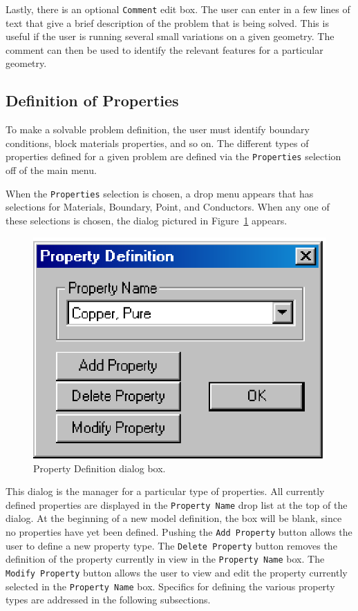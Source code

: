 Lastly, there is an optional \texttt{Comment} edit box. The user
can enter in a few lines of text that give a brief description of
the problem that is being solved. This is useful if the user is
running several small variations on a given geometry. The comment
can then be used to identify the relevant features for a particular
geometry.

\subsection{Definition of Properties}

To make a solvable problem definition, the user must identify boundary
conditions, block materials properties, and so on. The different types of
properties defined for a given problem are defined via the
\texttt{Properties} selection off of the main menu.

When the \texttt{Properties} selection is chosen, a drop menu
appears that has selections for Materials, Boundary, Point, and
Conductors. When any one of these selections is chosen, the dialog
pictured in Figure~\ref{hfig7} appears.

\begin{figure}[htbp]
\centerline{\includegraphics{hpropdef.ps}}
\caption{Property Definition dialog box.}
\label{hfig7}
\end{figure}




This dialog is the manager for a particular type of properties. All
currently defined properties are displayed in the \texttt{Property
Name} drop list at the top of the dialog. At the beginning of a new
model definition, the box will be blank, since no properties have
yet been defined. Pushing the \texttt{Add Property} button allows
the user to define a new property type. The \texttt{Delete
Property} button removes the definition of the property currently
in view in the \texttt{Property Name} box. The \texttt{Modify
Property} button allows the user to view and edit the property
currently selected in the \texttt{Property Name} box. Specifics for
defining the various property types are addressed in the
following subsections.

